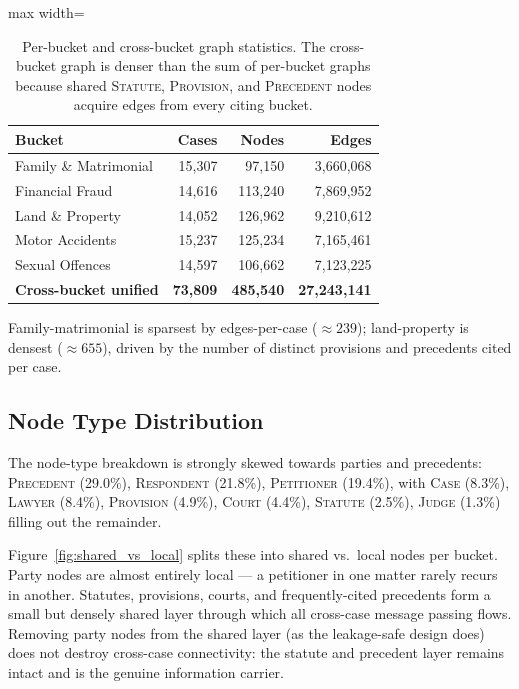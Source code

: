 \begin{table}[H]
  \centering
  \small
  \begin{adjustbox}{max width=\textwidth}
  \begin{tabular}{lrrr}
    \toprule
    Bucket & Cases & Nodes & Edges \\
    \midrule
    Family \& Matrimonial & 15{,}307 & 97{,}150 & 3{,}660{,}068 \\
    Financial Fraud & 14{,}616 & 113{,}240 & 7{,}869{,}952 \\
    Land \& Property & 14{,}052 & 126{,}962 & 9{,}210{,}612 \\
    Motor Accidents & 15{,}237 & 125{,}234 & 7{,}165{,}461 \\
    Sexual Offences & 14{,}597 & 106{,}662 & 7{,}123{,}225 \\
    \midrule
    \textbf{Cross-bucket unified} & \textbf{73{,}809} & \textbf{485{,}540} & \textbf{27{,}243{,}141} \\
    \bottomrule
  \end{tabular}
  \end{adjustbox}
  \caption{Per-bucket and cross-bucket graph statistics. The cross-bucket graph is denser than the sum of per-bucket graphs because shared \textsc{Statute}, \textsc{Provision}, and \textsc{Precedent} nodes acquire edges from every citing bucket.}
  \label{tab:graph_stats}
\end{table}

Family-matrimonial is sparsest by edges-per-case ($\approx 239$); land-property is densest ($\approx 655$), driven by the number of distinct provisions and precedents cited per case.

\subsection{Node Type Distribution}

The node-type breakdown is strongly skewed towards parties and precedents: \textsc{Precedent} (29.0\%), \textsc{Respondent} (21.8\%), \textsc{Petitioner} (19.4\%), with \textsc{Case} (8.3\%), \textsc{Lawyer} (8.4\%), \textsc{Provision} (4.9\%), \textsc{Court} (4.4\%), \textsc{Statute} (2.5\%), \textsc{Judge} (1.3\%) filling out the remainder.

Figure~\ref{fig:shared_vs_local} splits these into shared vs.\ local nodes per bucket. Party nodes are almost entirely local --- a petitioner in one matter rarely recurs in another. Statutes, provisions, courts, and frequently-cited precedents form a small but densely shared layer through which all cross-case message passing flows. Removing party nodes from the shared layer (as the leakage-safe design does) does not destroy cross-case connectivity: the statute and precedent layer remains intact and is the genuine information carrier.

